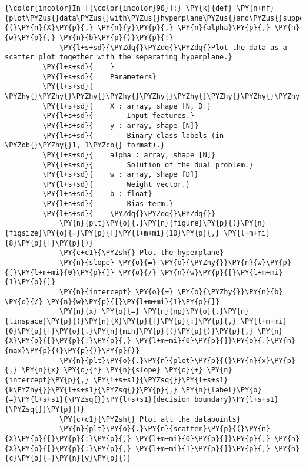     \begin{Verbatim}[commandchars=\\\{\}]
{\color{incolor}In [{\color{incolor}90}]:} \PY{k}{def} \PY{n+nf}{plot\PYZus{}data\PYZus{}with\PYZus{}hyperplane\PYZus{}and\PYZus{}support\PYZus{}vectors}\PY{p}{(}\PY{n}{X}\PY{p}{,} \PY{n}{y}\PY{p}{,} \PY{n}{alpha}\PY{p}{,} \PY{n}{w}\PY{p}{,} \PY{n}{b}\PY{p}{)}\PY{p}{:}
             \PY{l+s+sd}{\PYZdq{}\PYZdq{}\PYZdq{}Plot the data as a scatter plot together with the separating hyperplane.}
         \PY{l+s+sd}{    }
         \PY{l+s+sd}{    Parameters}
         \PY{l+s+sd}{    \PYZhy{}\PYZhy{}\PYZhy{}\PYZhy{}\PYZhy{}\PYZhy{}\PYZhy{}\PYZhy{}\PYZhy{}\PYZhy{}}
         \PY{l+s+sd}{    X : array, shape [N, D]}
         \PY{l+s+sd}{        Input features.}
         \PY{l+s+sd}{    y : array, shape [N]}
         \PY{l+s+sd}{        Binary class labels (in \PYZob{}\PYZhy{}1, 1\PYZcb{} format).}
         \PY{l+s+sd}{    alpha : array, shape [N]}
         \PY{l+s+sd}{        Solution of the dual problem.}
         \PY{l+s+sd}{    w : array, shape [D]}
         \PY{l+s+sd}{        Weight vector.}
         \PY{l+s+sd}{    b : float}
         \PY{l+s+sd}{        Bias term.}
         \PY{l+s+sd}{    \PYZdq{}\PYZdq{}\PYZdq{}}
             \PY{n}{plt}\PY{o}{.}\PY{n}{figure}\PY{p}{(}\PY{n}{figsize}\PY{o}{=}\PY{p}{[}\PY{l+m+mi}{10}\PY{p}{,} \PY{l+m+mi}{8}\PY{p}{]}\PY{p}{)}
             \PY{c+c1}{\PYZsh{} Plot the hyperplane}
             \PY{n}{slope} \PY{o}{=} \PY{o}{\PYZhy{}}\PY{n}{w}\PY{p}{[}\PY{l+m+mi}{0}\PY{p}{]} \PY{o}{/} \PY{n}{w}\PY{p}{[}\PY{l+m+mi}{1}\PY{p}{]}
             \PY{n}{intercept} \PY{o}{=} \PY{o}{\PYZhy{}}\PY{n}{b} \PY{o}{/} \PY{n}{w}\PY{p}{[}\PY{l+m+mi}{1}\PY{p}{]}
             \PY{n}{x} \PY{o}{=} \PY{n}{np}\PY{o}{.}\PY{n}{linspace}\PY{p}{(}\PY{n}{X}\PY{p}{[}\PY{p}{:}\PY{p}{,} \PY{l+m+mi}{0}\PY{p}{]}\PY{o}{.}\PY{n}{min}\PY{p}{(}\PY{p}{)}\PY{p}{,} \PY{n}{X}\PY{p}{[}\PY{p}{:}\PY{p}{,} \PY{l+m+mi}{0}\PY{p}{]}\PY{o}{.}\PY{n}{max}\PY{p}{(}\PY{p}{)}\PY{p}{)}
             \PY{n}{plt}\PY{o}{.}\PY{n}{plot}\PY{p}{(}\PY{n}{x}\PY{p}{,} \PY{n}{x} \PY{o}{*} \PY{n}{slope} \PY{o}{+} \PY{n}{intercept}\PY{p}{,} \PY{l+s+s1}{\PYZsq{}}\PY{l+s+s1}{k\PYZhy{}}\PY{l+s+s1}{\PYZsq{}}\PY{p}{,} \PY{n}{label}\PY{o}{=}\PY{l+s+s1}{\PYZsq{}}\PY{l+s+s1}{decision boundary}\PY{l+s+s1}{\PYZsq{}}\PY{p}{)}
             \PY{c+c1}{\PYZsh{} Plot all the datapoints}
             \PY{n}{plt}\PY{o}{.}\PY{n}{scatter}\PY{p}{(}\PY{n}{X}\PY{p}{[}\PY{p}{:}\PY{p}{,} \PY{l+m+mi}{0}\PY{p}{]}\PY{p}{,} \PY{n}{X}\PY{p}{[}\PY{p}{:}\PY{p}{,} \PY{l+m+mi}{1}\PY{p}{]}\PY{p}{,} \PY{n}{c}\PY{o}{=}\PY{n}{y}\PY{p}{)}

\end{Verbatim}
